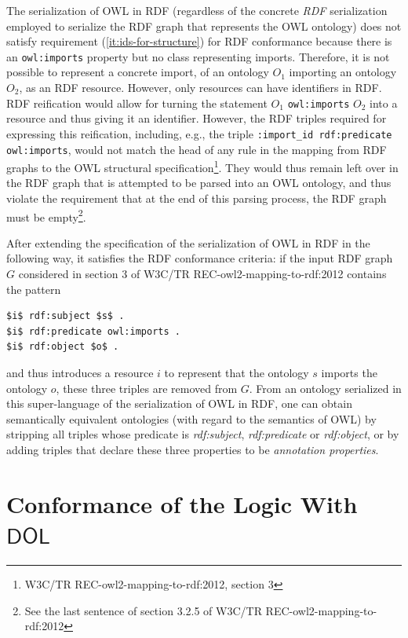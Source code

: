 \documentclass[10pt,fleqn,final]{scrreprt}
\newcommand*{\DOL}{\ensuremath{\mathsf{DOL}}\xspace}
\newcommand{\nisref}[1]{#1}
\newenvironment{definitions}[0]{\medskip }{}
\begin{document}
\begin{definitions}
The serialization of OWL in RDF (regardless of the concrete \emph{RDF} serialization employed to serialize the RDF graph that represents the OWL ontology) does not satisfy requirement (\ref{it:ids-for-structure}) for RDF conformance because there is an \texttt{owl:imports} property but no class representing imports. 
Therefore, it is not possible to represent a concrete import, of an ontology $O_1$ importing an ontology $O_2$, as an RDF resource.
However, only resources can have identifiers in RDF.
RDF reification would allow for turning the statement $O_1$ \texttt{owl:imports} $O_2$ into a resource and thus giving it an identifier. 
However, the RDF triples required for expressing this reification, including, e.g., the triple \texttt{:import\_id rdf:predicate owl:imports},  would not match the head of any rule in the mapping from RDF graphs to the OWL structural specification\footnote{\nisref{W3C/TR REC-owl2-mapping-to-rdf:2012}, section 3}. 
They would thus remain left over in the RDF graph that is attempted to be parsed into an OWL ontology, and thus violate the requirement that at the end of this parsing process, the RDF graph must be empty\footnote{See the last sentence of section 3.2.5 of \nisref{W3C/TR REC-owl2-mapping-to-rdf:2012}}.

After extending the specification of the serialization of OWL in RDF in the following way, it satisfies the RDF conformance criteria: if the input RDF graph $G$ considered in section 3 of \nisref{W3C/TR REC-owl2-mapping-to-rdf:2012} contains the pattern

\begin{lstlisting}[basicstyle=\small\ttfamily,language=N3,mathescape]
$i$ rdf:subject $s$ .
$i$ rdf:predicate owl:imports .
$i$ rdf:object $o$ .
\end{lstlisting}

and thus introduces a resource $i$ to represent that the ontology $s$ imports the ontology $o$, these three triples are removed from $G$.
From an ontology serialized in this super-language of the serialization of OWL in RDF, one can obtain semantically equivalent ontologies (with regard to the semantics of OWL) by stripping all triples whose predicate is \textit{rdf:subject}, \textit{rdf:predicate} or \textit{rdf:object}, or by adding triples that declare these three properties to be \emph{annotation properties}.

\section{Conformance of the \SROIQ Logic With \DOL}\label{a:owl-logic}


\end{definitions}
\end{document}
